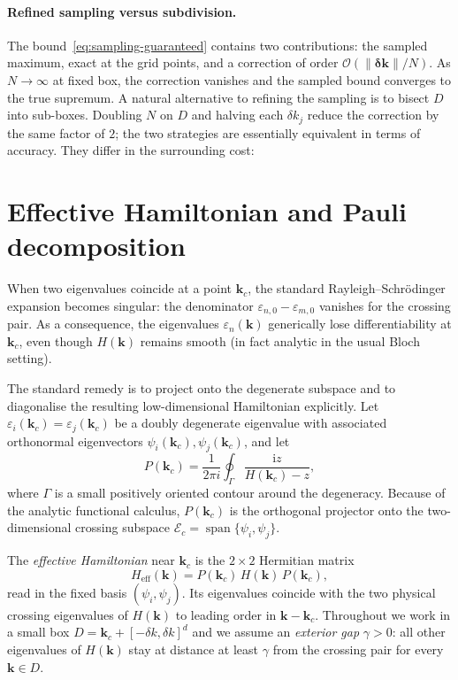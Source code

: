 \documentclass[11pt]{article}
\numberwithin{equation}{section}
\begin{document}
\paragraph{Refined sampling versus subdivision.}
The bound~\eqref{eq:sampling-guaranteed} contains two contributions: the
sampled maximum, exact at the grid points, and a correction of order
\(\mathcal{O}(\|\bm{\delta\mathbf{k}}\|/N)\). As \(N \to \infty\) at fixed box,
the correction vanishes and the sampled bound converges to the true supremum.
A natural alternative to refining the sampling is to bisect \(D\) into
sub-boxes. Doubling \(N\) on \(D\) and halving each \(\delta k_j\) reduce the
correction by the same factor of \(2\); the two strategies are essentially
equivalent in terms of accuracy. They differ in the surrounding cost:


\newpage
\section{Effective Hamiltonian and Pauli decomposition}
\label{sec:Heff}

When two eigenvalues coincide at a point \(\mathbf{k}_c\), the standard
Rayleigh--Schr\"odinger expansion becomes singular: the denominator
\(\varepsilon_{n,0}-\varepsilon_{m,0}\) vanishes for the crossing pair.  As a
consequence, the eigenvalues \(\varepsilon_n(\mathbf{k})\) generically lose
differentiability at \(\mathbf{k}_c\), even though \(H(\mathbf{k})\) remains smooth
(in fact analytic in the usual Bloch setting).

The standard remedy is to project onto the degenerate subspace and to diagonalise
the resulting low-dimensional Hamiltonian explicitly.  Let
\(\varepsilon_i(\mathbf{k}_c)=\varepsilon_j(\mathbf{k}_c)\) be a doubly degenerate eigenvalue
with associated orthonormal eigenvectors \(\psi_i(\mathbf{k}_c),\psi_j(\mathbf{k}_c)\),
and let
\begin{equation}
    P(\mathbf{k}_c)=\frac{1}{2\pi i}\oint_{\Gamma}\frac{\mathrm{i} z}{H(\mathbf{k}_c)-z},
    \label{eq:projector-contour}
\end{equation}
where \(\Gamma\) is a small positively oriented contour around the degeneracy.
Because of the analytic functional calculus, \(P(\mathbf{k}_c)\) is the orthogonal
projector onto the two-dimensional crossing subspace
\(\mathcal{E}_c=\operatorname{span}\{\psi_i,\psi_j\}\).

The \emph{effective Hamiltonian} near \(\mathbf{k}_c\) is the \(2\times2\) Hermitian
matrix
\begin{equation}
    H_{\mathrm{eff}}(\mathbf{k})
    = P(\mathbf{k}_c)\,H(\mathbf{k})\,P(\mathbf{k}_c),
    \label{eq:Heff}
\end{equation}
read in the fixed basis \((\psi_i,\psi_j)\).  Its eigenvalues coincide with the
two physical crossing eigenvalues of \(H(\mathbf{k})\) to leading order in
\(\mathbf{k}-\mathbf{k}_c\).  Throughout we work in a small box
\(D=\mathbf{k}_c+[-\delta k,\delta k]^d\) and we assume an \emph{exterior gap}
\(\gamma>0\): all other eigenvalues of \(H(\mathbf{k})\) stay at distance at least
\(\gamma\) from the crossing pair for every \(\mathbf{k}\in D\).
\end{document}
